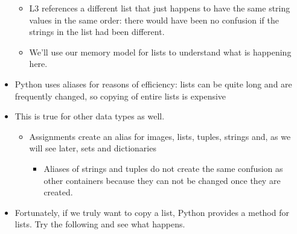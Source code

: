 \documentclass[letterpaper,10pt,english]{sphinxmanual}
\begin{document}
\begin{itemize}
\begin{itemize}
\item {} 
L3 references a different list that just happens to have the
same string values in the same order: there would have been no
confusion if the strings in the list had been different.

\item {} 
We’ll use our memory model for lists to understand what is
happening here.

\end{itemize}

\item {} 
Python uses aliases for reasons of efficiency: lists can be quite
long and are frequently changed, so copying of entire lists is
expensive

\item {} 
This is true for other  data types as well.
\begin{itemize}
\item {} 
Assignments create an alias for images, lists, tuples, strings and, as we
will see later, sets and dictionaries
\begin{itemize}
\item {} 
Aliases of strings and tuples do not create the same confusion
as other containers because they can not be changed once they
are created.

\end{itemize}

\end{itemize}

\item {} 
Fortunately, if we truly want to copy a list, Python provides a
 method for lists.  Try the following and see what
happens.

%
\begin{sphinxVerbatim}[commandchars=\\\{\}]
  \PYG{p}{[}\PYG{p}{]}
  
  
\end{sphinxVerbatim}

\end{itemize}
\end{document}

